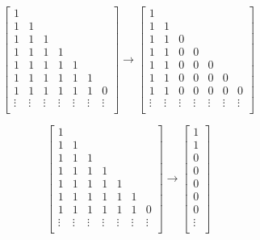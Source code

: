 \begin{equation}
    \begin{bmatrix}
        1 &  &  \\
        1 & 1 &  \\
        1 & 1 & 1 \\
        1 & 1 & 1 & 1 \\
        1 & 1 & 1 & 1 & 1 \\
        1 & 1 & 1 & 1 & 1 & 1\\
        1 & 1 & 1 & 1 & 1 & 1 & 0 \\
        \vdots & \vdots & \vdots & \vdots & \vdots & \vdots & \vdots \\
    \end{bmatrix} \to 
    \begin{bmatrix}
        1 &  &  \\
        1 & 1 &  \\
        1 & 1 & 0 \\
        1 & 1 & 0 & 0 \\
        1 & 1 & 0 & 0 & 0 \\
        1 & 1 & 0 & 0 & 0 & 0\\
        1 & 1 & 0 & 0 & 0 & 0 & 0 \\
        \vdots & \vdots & \vdots & \vdots & \vdots & \vdots & \vdots \\
    \end{bmatrix}
\end{equation}

\begin{equation}
    \begin{bmatrix}
        1 &  &  \\
        1 & 1 &  \\
        1 & 1 & 1 \\
        1 & 1 & 1 & 1 \\
        1 & 1 & 1 & 1 & 1 \\
        1 & 1 & 1 & 1 & 1 & 1\\
        1 & 1 & 1 & 1 & 1 & 1 & 0 \\
        \vdots & \vdots & \vdots & \vdots & \vdots & \vdots & \vdots \\
    \end{bmatrix} \to 
    \begin{bmatrix}
        1 \\
        1 \\
        0 \\
        0 \\
        0 \\
        0 \\
        0 \\
        \vdots \\
    \end{bmatrix}
\end{equation}

